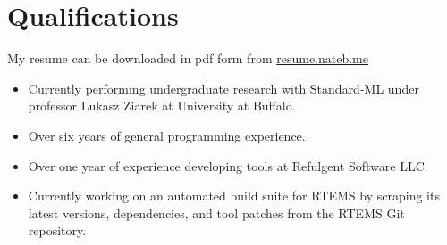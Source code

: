 \documentclass[12pt]{article}
\begin{document}
\section{Qualifications}
My resume can be downloaded in pdf form from \url{resume.nateb.me}
\begin{itemize}
\item Currently performing undergraduate research with Standard-ML under professor Lukasz Ziarek at University at Buffalo.
\item Over six years of general programming experience.
\item Over one year of experience developing tools at Refulgent Software LLC.
\item Currently working on an automated build suite for RTEMS by scraping its latest versions, dependencies, and tool patches from the RTEMS Git repository.

\end{itemize}
\end{document}
